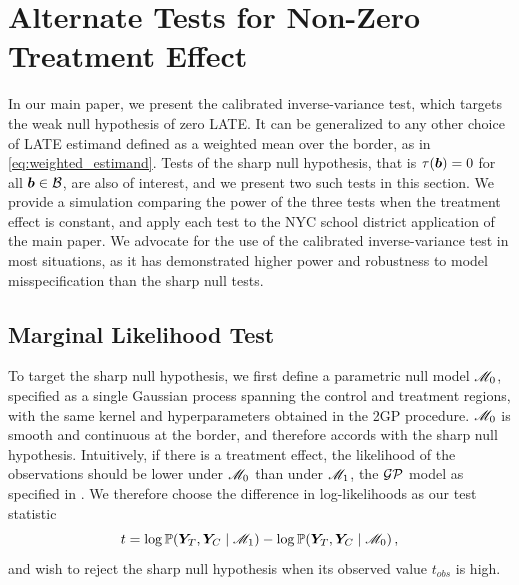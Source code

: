 \restoregeometry

\section{Alternate Tests for Non-Zero Treatment Effect}
\label{sec:alternate_tests}

	In our main paper, we present the calibrated inverse-variance test, which targets the weak null hypothesis of zero LATE.
It can be generalized to any other choice of LATE estimand defined as a weighted mean over the border, as in \autoref{eq:weighted_estimand}.
Tests of the sharp null hypothesis, that is \(\tau(\bm{b})=0\) for all \(\bm{b} \in \mathcal{B}\), are also of interest, and we present two such tests in this section.
We provide a simulation comparing the power of the three tests when the treatment effect is constant, and apply each test to the NYC school district application of the main paper.
We advocate for the use of the calibrated inverse-variance test in most situations, as it has demonstrated higher power and robustness to model misspecification than the sharp null tests.

\subsection{Marginal Likelihood Test}

	To target the sharp null hypothesis, we first define a parametric null model \(\mathscr{M}_0\),
specified as a single Gaussian process spanning the control and treatment regions,
with the same kernel and hyperparameters obtained in the 2GP procedure.
\(\mathscr{M}_0\) is smooth and continuous at the border,
and therefore accords with the sharp null hypothesis.
Intuitively, if there is a treatment effect,
the likelihood of the observations should be lower under \(\mathscr{M}_0\) than under \(\mathscr{M}_1\),
the \(\operatorname{\mathcal{GP}}\) model as specified in .
We therefore choose the difference in log-likelihoods as our test statistic
\begin{equation}
    t = \log \Pr\del{\yt{}, \yc{} \mid \modalt} - \log \Pr\del{\yt{}, \yc{} \mid \modnull} \,,
\end{equation}
and wish to reject the sharp null hypothesis when its observed value \(t_{obs}\) is high.

